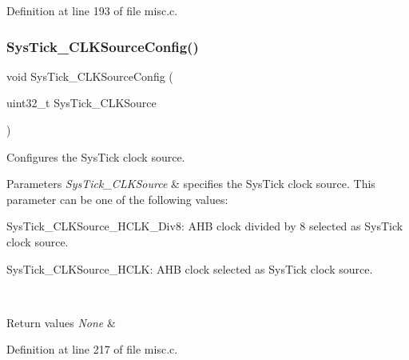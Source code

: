 Definition at line 193 of file misc.\+c.

\mbox{\label{group___m_i_s_c___private___functions_ga2777d255bb06ad62bb6372a9db1ff385}} 
\subsubsection{\texorpdfstring{Sys\+Tick\+\_\+\+C\+L\+K\+Source\+Config()}{SysTick\_CLKSourceConfig()}}
{\footnotesize\ttfamily void Sys\+Tick\+\_\+\+C\+L\+K\+Source\+Config (\begin{DoxyParamCaption}\item[{uint32\+\_\+t}]{Sys\+Tick\+\_\+\+C\+L\+K\+Source }\end{DoxyParamCaption})}



Configures the Sys\+Tick clock source. 


\begin{DoxyParams}{Parameters}
{\em Sys\+Tick\+\_\+\+C\+L\+K\+Source} & specifies the Sys\+Tick clock source. This parameter can be one of the following values\+: \begin{DoxyItemize}
\item Sys\+Tick\+\_\+\+C\+L\+K\+Source\+\_\+\+H\+C\+L\+K\+\_\+\+Div8\+: A\+HB clock divided by 8 selected as Sys\+Tick clock source. \item Sys\+Tick\+\_\+\+C\+L\+K\+Source\+\_\+\+H\+C\+LK\+: A\+HB clock selected as Sys\+Tick clock source. \end{DoxyItemize}
\\
\hline
\end{DoxyParams}

\begin{DoxyRetVals}{Return values}
{\em None} & \\
\hline
\end{DoxyRetVals}


Definition at line 217 of file misc.\+c.

